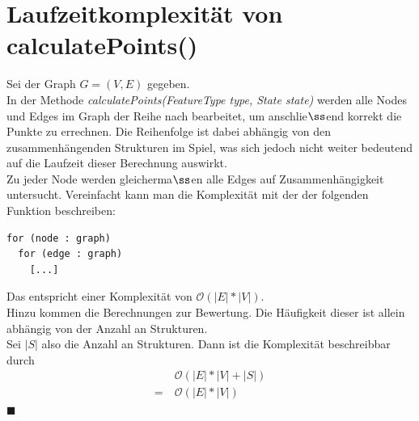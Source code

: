 \documentclass{article}
\newcommand*{\qed}{\hfill\ensuremath{\blacksquare}\\}%
\begin{document}
\section{Laufzeitkomplexit\"at von calculatePoints()}
Sei der Graph $G = (V,E)$ gegeben.\\
In der Methode \textit{calculatePoints(FeatureType type, State state)} werden alle Nodes und Edges im Graph der Reihe nach bearbeitet, um anschlie$\ss$end korrekt die Punkte zu errechnen. Die Reihenfolge ist dabei abh\"angig von den zusammenh\"angenden Strukturen im Spiel, was sich jedoch nicht weiter bedeutend auf die Laufzeit dieser Berechnung auswirkt.\\
Zu jeder Node werden gleicherma$\ss$en alle Edges auf Zusammenh\"angigkeit untersucht. Vereinfacht kann man die Komplexit\"at mit der der folgenden Funktion beschreiben:
\begin{lstlisting}
for (node : graph)
  for (edge : graph)
    [...]
\end{lstlisting}
Das entspricht einer Komplexit\"at von $\mathcal{O}(|E|*|V|)$.\\
Hinzu kommen die Berechnungen zur Bewertung. Die H\"aufigkeit dieser ist allein abh\"angig von der Anzahl an Strukturen.\\
Sei $|S|$ also die Anzahl an Strukturen. Dann ist die Komplexit\"at beschreibbar durch
\begin{align*}
&\mathcal{O}(|E|*|V|+|S|)\\
= \ &\mathcal{O}(|E|*|V|)
\end{align*}
\qed
\end{document}
